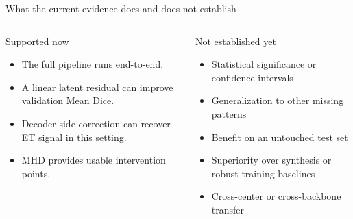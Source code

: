 \documentclass[aspectratio=169,11pt]{beamer}
\begin{document}
\begin{frame}{What the current evidence does and does not establish}
  \begin{columns}[T,onlytextwidth]
      \begin{exampleblock}{Supported now}
        \begin{itemize}
          \item The full pipeline runs end-to-end.
          \item A linear latent residual can improve validation Mean Dice.
          \item Decoder-side correction can recover ET signal in this setting.
          \item MHD provides usable intervention points.
        \end{itemize}
      \end{exampleblock}
      \begin{alertblock}{Not established yet}
        \begin{itemize}
          \item Statistical significance or confidence intervals
          \item Generalization to other missing patterns
          \item Benefit on an untouched test set
          \item Superiority over synthesis or robust-training baselines
          \item Cross-center or cross-backbone transfer
        \end{itemize}
      \end{alertblock}
  \end{columns}
\end{frame}
\end{document}
